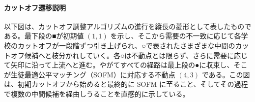 \documentclass[12pt, a4paper]{article}
\theoremstyle{definition}
\theoremstyle{remark}
\theoremstyle{plain}
\begin{document}

\paragraph{カットオフ遷移説明}
以下図は、カットオフ調整アルゴリズムの進行を縦長の菱形として表したものである。最下段の■が初期値 $(1,1)$ を示し、そこから需要の不一致に応じて各学校のカットオフが一段階ずつ引き上げられ、○で表されたさまざまな中間のカットオフ候補へと枝分かれしていく。各○は不動点とは限らず、さらに需要に応じて矢印に沿って上流へと進む。やがてすべての経路は最上段の●に収束し、そこが生徒最適公平マッチング（SOFM）に対応する不動点 $(4,3)$ である。この図は、初期カットオフから始めると最終的に SOFM に至ること、そしてその過程で複数の中間候補を経由しうることを直感的に示している。
\end{document}

